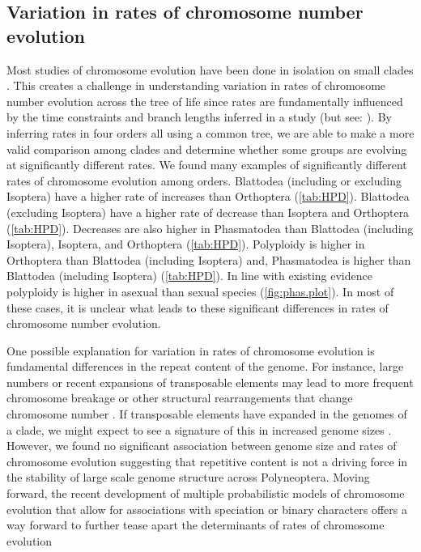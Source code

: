\subsection{Variation in rates of chromosome number evolution}
Most studies of chromosome evolution have been done in isolation on small clades \citep{rockman2002, mccann2016, deoliveira}. 
This creates a challenge in understanding variation in rates of chromosome number evolution across the tree of life since rates are fundamentally influenced by the time constraints and branch lengths inferred in a study (but see: \citealt{blackmon2019meiotic, zenil2017}).
By inferring rates in four orders all using a common tree, we are able to make a more valid comparison among clades and determine whether some groups are evolving at significantly different rates.
We found many examples of significantly different rates of chromosome evolution among orders.
Blattodea (including or excluding Isoptera) have a higher rate of increases than Orthoptera (\cref{tab:HPD}).
Blattodea (excluding Isoptera) have a higher rate of decrease than Isoptera and Orthoptera  (\cref{tab:HPD}).
Decreases are also higher in Phasmatodea than Blattodea (including Isoptera), Isoptera, and Orthoptera  (\cref{tab:HPD}).
Polyploidy is higher in Orthoptera than Blattodea (including Isoptera) and, Phasmatodea is higher than Blattodea (including Isoptera)  (\cref{tab:HPD}).
In line with existing evidence \citep{lokki1980polyploidy, blackmon2016} polyploidy is higher in asexual than sexual species (\cref{fig:phas.plot}).
In most of these cases, it is unclear what leads to these significant differences in rates of chromosome number evolution.

One possible explanation for variation in rates of chromosome evolution is fundamental differences in the repeat content of the genome.
For instance, large numbers or recent expansions of transposable elements may lead to more frequent chromosome breakage or other structural rearrangements that change chromosome number \citep{carbone2014gibbon}.
If transposable elements have expanded in the genomes of a clade, we might expect to see a signature of this in increased genome sizes \citep{kidwell2002transposable}.
However, we found no significant association between genome size and rates of chromosome evolution suggesting that repetitive content is not a driving force in the stability of large scale genome structure across Polyneoptera.
Moving forward, the recent development of multiple probabilistic models of chromosome evolution that allow for associations with speciation or binary characters offers a way forward to further tease apart the determinants of rates of chromosome evolution \citep{freyman2018, zenil2018chromploid, blackmon2019meiotic}

